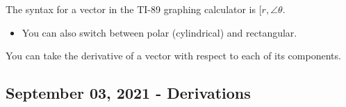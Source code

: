 \documentclass[../main.tex]{subfiles}
\begin{document}
\begin{remark}
  The syntax for a vector in the TI-89 graphing calculator is 
  $[r,\angle \theta $. 

  \begin{itemize}
    \item You can also switch between polar (cylindrical) and rectangular.
  \end{itemize}
\end{remark}

\begin{remark}
  You can take the derivative of a vector with respect to each of its components.
\end{remark}

\subsection{September 03, 2021 - Derivations}

\begin{example}
  $$\Delta y = v_0t + \frac{1}{2}at^2$$
  $$t = \frac{x}{v_0cos(\theta)}$$
  $$y = \frac{v_0\sin(\theta)x}{v_0\cos(\theta) - \frac{gx^2}{2v_0^2cos^2\(theta)}$$
  $$y = \tan(\theta)x - \frac{gx}{2v_0^2cos^2(\theta)}
\end{example}
\end{document}
